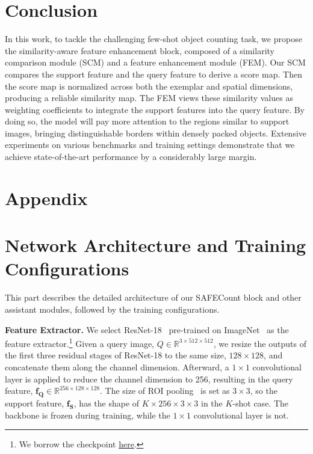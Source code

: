 \documentclass[10pt,twocolumn,letterpaper]{article}
\newcommand{\method}{SAFECount\xspace}
\newcommand{\fs}{\bm{f_S}}
\newcommand{\fq}{\bm{f_Q}}
\begin{document}
 \section{Conclusion}\label{sec:conclusion}


In this work, to tackle the challenging few-shot object counting task, we propose the similarity-aware feature enhancement block, composed of a similarity comparison module (SCM) and a feature enhancement module (FEM). Our SCM compares the support feature and the query feature to derive a score map. Then the score map is normalized across both the exemplar and spatial dimensions, producing a reliable similarity map. The FEM views these similarity values as weighting coefficients to integrate the support features into the query feature. By doing so, the model will pay more attention to the regions similar to support images, bringing distinguishable borders within densely packed objects. Extensive experiments on various benchmarks and training settings demonstrate that we achieve state-of-the-art performance by a considerably large margin. 


 
{
\small
\clearpage


}

\appendix
\section*{Appendix}
\section{Network Architecture and Training Configurations}\label{appendix:sec:architecture}


This part describes the detailed architecture of our \method block and other assistant modules, followed by the training configurations.


\vspace{2pt}\noindent\textbf{Feature Extractor.} 
We select ResNet-18~\cite{resnet} pre-trained on ImageNet~\cite{imagenet} as the feature extractor.\footnote{We borrow the checkpoint \href{https://download.pytorch.org/models/resnet18-5c106cde.pth}{here}.}
Given a query image, $Q \in \mathbb{R}^{3 \times 512 \times 512}$, we resize the outputs of the first three residual stages of ResNet-18 to the same size, $128 \times 128$, and concatenate them along the channel dimension. 
Afterward, a $1 \times 1$ convolutional layer is applied to reduce the channel dimension to 256, resulting in the query feature, $\fq \in \mathbb{R}^{256 \times 128 \times 128}$. 
The size of ROI pooling~\cite{faster_rcnn} is set as $3 \times 3$, so the support feature, $\fs$, has the shape of $K \times 256 \times 3 \times 3$ in the $K$-shot case. 
The backbone is frozen during training, while the $1 \times 1$ convolutional layer is not. 
\end{document}
